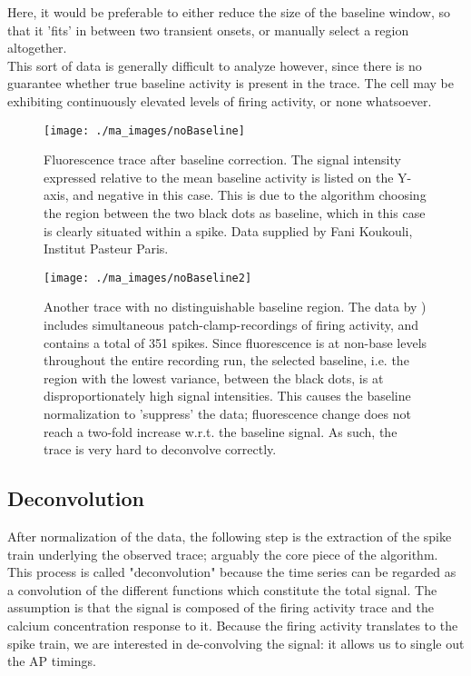 \documentclass[titlepage]{article}
\begin{document}
Here, it would be preferable to either reduce the size of the baseline window, so that it 'fits' in between two transient onsets, or manually select a region altogether. \\
This sort of data is generally difficult to analyze however, since there is no guarantee whether true baseline activity is present in the trace. The cell may be exhibiting continuously elevated levels of firing activity, or none whatsoever.
\begin{figure}[h]
\centering
\texttt{[image: ./ma\_images/noBaseline]}
\caption{Fluorescence trace after baseline correction. The signal intensity expressed relative to the mean baseline activity is listed on the Y-axis, and negative in this case. This is due to the algorithm choosing the region between the two black dots as baseline, which in this case is clearly situated within a spike. Data supplied by Fani Koukouli, Institut Pasteur Paris.}
\label{fig:noBaseline}
\end{figure}
\begin{figure}[h]
\centering
\texttt{[image: ./ma\_images/noBaseline2]}
\caption{Another trace with no distinguishable baseline region. The data by \citeauthor{dana_sensitive_2016}\cite{dana_sensitive_2016}) includes simultaneous patch-clamp-recordings of firing activity, and contains a total of 351 spikes. Since fluorescence is at non-base levels throughout the entire recording run, the selected baseline, i.e. the region with the lowest variance, between the black dots, is at disproportionately high signal intensities. This causes the baseline normalization to 'suppress' the data; fluorescence change does not reach a two-fold increase w.r.t. the baseline signal. As such, the trace is very hard to deconvolve correctly.}
\label{fig:noBaseline2}
\end{figure}
\subsection{Deconvolution} \label{deconvo}
After normalization of the data, the following step is the extraction of the spike train underlying the observed trace; arguably the core piece of the algorithm.
This process is called "deconvolution" because the time series can be regarded as a convolution of the different functions which constitute the total signal.
The assumption is that the signal is composed of the firing activity trace and the calcium concentration response to it.
Because the firing activity translates to the spike train, we are interested in de-convolving the signal: it allows us to single out the AP timings. 
\end{document}
